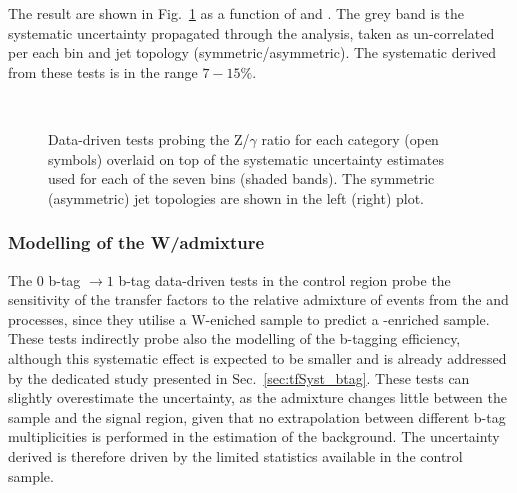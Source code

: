 The result are shown in Fig.~\ref{fig:closurePhoToMuMu} as a function
of \scalht and \njet.  The grey band is the systematic uncertainty
propagated through the analysis, taken as un-correlated per each
\scalht bin and jet topology (symmetric/asymmetric). The systematic
derived from these tests is in the range $7-15\%$.

\begin{figure}[h!]
  \begin{center}
    ~~
    \caption{Data-driven tests probing the Z/$\gamma$ ratio for each
      \njet category (open symbols) overlaid on top of the systematic
      uncertainty estimates used for each of the seven \scalht bins
      (shaded bands). 
      The symmetric (asymmetric) jet topologies are shown in the left (right) plot.      
    }
    \label{fig:closurePhoToMuMu}
  \end{center} 
\end{figure}

\subsubsection*{Modelling of the W/\ttbar admixture}
\label{sec:tfSyst_WttAd}

The $0$ b-tag $\rightarrow1$ b-tag data-driven tests in the \mj
control region probe the sensitivity of the transfer factors to the
relative admixture of events from the \wj and \ttbar processes,
since they utilise a W-eniched sample to predict a \ttbar-enriched
sample.  These tests indirectly probe also the modelling of the
b-tagging efficiency, although this systematic effect is expected to
be smaller and is already addressed by the dedicated study presented
in Sec.~\ref{sec:tfSyst_btag}.  These tests can slightly overestimate
the uncertainty, as the admixture changes little between the
\mj sample and the signal region, given that no extrapolation between
different b-tag multiplicities is performed in the estimation of the
background. The uncertainty derived is therefore driven by the
limited statistics available in the control sample. 

